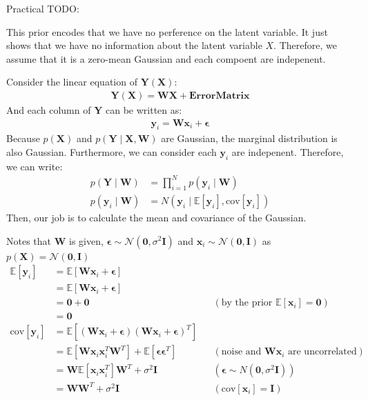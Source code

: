 \documentclass[12pt]{article}
\newenvironment{question}[2][Question]{\begin{trivlist}
\kern10pt
\item[\hskip \labelsep {\bfseries #1}\hskip \labelsep {\bfseries #2.}]}{\end{trivlist}}
\begin{document}
\begin{question}{11}
  Practical TODO:
\end{question}

\begin{question}{12}
This prior encodes that we have no perference on the latent variable. It just 
 shows that we have no information about the latent variable $X$. Therefore, 
 we assume that it is a zero-mean Gaussian and each compoent are indepenent.
\end{question}

\begin{question}{13}
Consider the linear equation of $\mathbf{Y}(\mathbf{X})$:
  \begin{align*}
    \mathbf{Y}(\mathbf{X}) = \mathbf{W}\mathbf{X} + \bm{ErrorMatrix}
  \end{align*}
And each column of $\mathbf{Y}$ can be written as:
\begin{align*}
  \mathbf{y}_i = \mathbf{W}\mathbf{x}_i + \bm{\epsilon}
\end{align*}
Because $p(\mathbf{X})$ and $p(\mathbf{Y}\mid\mathbf{X}, \mathbf{W})$ are Gaussian, 
 the marginal distribution is also Gaussian.
 Furthermore, we can consider each $\mathbf{y}_i$ are indepenent. Therefore, 
 we can write:
\begin{align*}
  p(\mathbf{Y}\mid\mathbf{W}) &= \prod_{i=1}^{N} p(\mathbf{y}_i\mid\mathbf{W}) \\
  p(\mathbf{y}_i\mid\mathbf{W}) &= N(\mathbf{y}_i\mid \mathbb{E}[\mathbf{y}_i], \text{cov}[\mathbf{y}_i])
\end{align*}
Then, our job is to calculate the mean and covariance of the Gaussian.

Notes that $\mathbf{W}$ is given, $\bm{\epsilon} \sim \mathcal{N}(\mathbf{0}, \sigma^2\mathbf{I})$
 and $\mathbf{x}_i \sim \mathcal{N}(\mathbf{0}, \mathbf{I})$ as 
 $p(\mathbf{X}) = \mathcal{N}(\mathbf{0}, \mathbf{I})$
\begin{align*}
  \mathbb{E}[\mathbf{y}_i] &= \mathbb{E}[\mathbf{W}\mathbf{x}_i + \bm{\epsilon}] \\ 
  &= \mathbb{E}[\mathbf{W}\mathbf{x}_i + \bm{\epsilon}] \\
  &= \mathbf{0} + \mathbf{0} 
                      && (\text{by the prior }\mathbb{E}[\mathbf{x}_i] = \mathbf{0})\\
  &= \mathbf{0} \\
  \text{cov}[\mathbf{y}_i] 
  &= \mathbb{E}[(\mathbf{W}\mathbf{x}_i + \bm{\epsilon})
                (\mathbf{W}\mathbf{x}_i + \bm{\epsilon})^{T}] \\
  &= \mathbb{E}[\mathbf{W}\mathbf{x}_i\mathbf{x}_i^T\mathbf{W}^T]
     + \mathbb{E}[\bm{\epsilon}\bm{\epsilon}^{T}]
     && (\text{noise and }\mathbf{W}\mathbf{x}_i\text{ are uncorrelated}) \\
  &= \mathbf{W}\mathbb{E}[\mathbf{x}_i\mathbf{x}_i^T]\mathbf{W}^T + \sigma^2 \mathbf{I}
     && (\bm{\epsilon} \sim N(\mathbf{0}, \sigma^2\mathbf{I})) \\
  &= \mathbf{W}\mathbf{W}^T + \sigma^2\mathbf{I}
     && (\text{cov}[\mathbf{x}_i] = \mathbf{I})
\end{align*}


\end{question}
\end{document}
